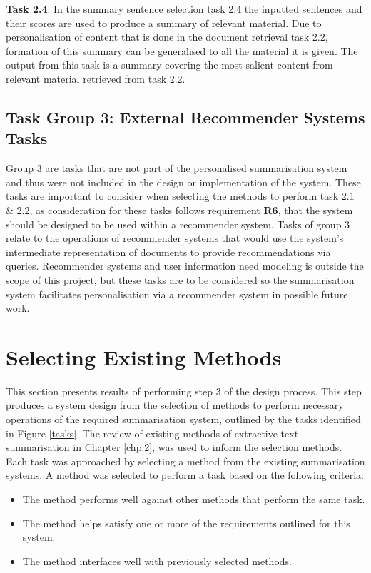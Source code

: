 \textbf{Task 2.4}: In the summary sentence selection task 2.4 the inputted sentences and their scores are used to produce a summary of relevant material. Due to personalisation of content that is done in the document retrieval task 2.2, formation of this summary can be generalised to all the material it is given. The output from this task is a summary covering the most salient content from relevant material retrieved from task 2.2. 

\subsection{Task Group 3: External Recommender Systems Tasks}
Group 3 are tasks that are not part of the personalised summarisation system and thus were not included in the design or implementation of the system. These tasks are important to consider when selecting the methods to perform task 2.1 \& 2.2, as consideration for these tasks follows requirement \textbf{R6}, that the system should be designed to be used within a recommender system. Tasks of group 3 relate to the operations of recommender systems that would use the system's intermediate representation of documents to provide recommendations via queries. Recommender systems and user information need modeling is outside the scope of this project, but these tasks are to be considered so the summarisation system facilitates personalisation via a recommender system in possible future work.

\section{Selecting Existing Methods}
This section presents results of performing step 3 of the design process. This step produces a system design from the selection of methods to perform necessary operations of the required summarisation system, outlined by the tasks identified in Figure \ref{tasks}. The review of existing methods of extractive text summarisation in Chapter \ref{chp:2}, was used to inform the selection methods. Each task was approached by selecting a method from the existing summarisation systems. A method was selected to perform a task based on the following criteria:
\begin{itemize}
    \item The method performs well against other methods that perform the same task.
    \item The method helps satisfy one or more of the requirements outlined for this system.
    \item The method interfaces well with previously selected methods.
\end{itemize}

